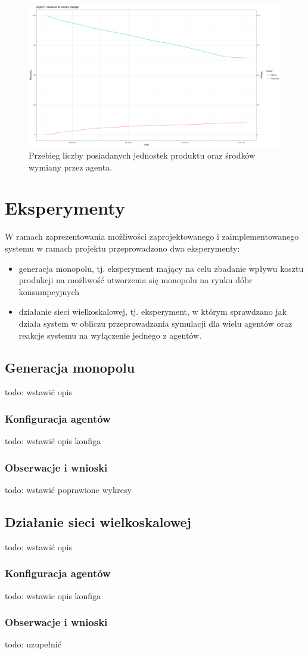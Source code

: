 \documentclass{article}
\begin{document}
\begin{figure}[H]
	\centering
	\includegraphics[width=\textwidth]{./analytics-image.png}
	\caption{Przebieg liczby posiadanych jednostek produktu oraz środków wymiany przez agenta.}
	\label{analytics-image}
\end{figure}

\section{Eksperymenty \label{sec3}}

W ramach zaprezentowania możliwości zaprojektowanego i zaimplementowanego systemu w ramach projektu przeprowadzono dwa eksperymenty:

\begin{itemize}
	\item generacja monopolu, tj. eksperyment mający na celu zbadanie wpływu kosztu produkcji na możliwość utworzenia się monopolu na rynku dóbr konsumpcyjnych	
	\item działanie sieci wielkoskalowej, tj. eksperyment, w którym sprawdzano jak działa system w obliczu przeprowadzania symulacji dla wielu agentów oraz reakcje systemu na wyłączenie jednego z agentów.
\end{itemize}

\subsection{Generacja monopolu}
todo: wstawić opis
\subsubsection{Konfiguracja agentów}
todo: wstawić opis konfiga
\subsubsection{Obserwacje i wnioski}
todo: wstawić poprawione wykresy
\subsection{Działanie sieci wielkoskalowej}
todo: wstawić opis
\subsubsection{Konfiguracja agentów}
todo: wstawic opis konfiga
\subsubsection{Obserwacje i wnioski}
todo: uzupełnić
\end{document}
